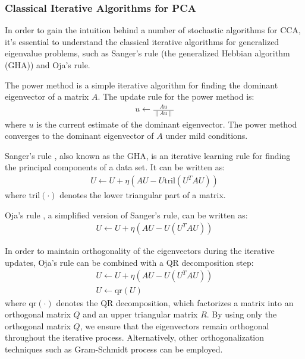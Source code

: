 \subsubsection{Classical Iterative Algorithms for PCA}
In order to gain the intuition behind a number of stochastic algorithms for CCA, it's essential to understand the classical iterative algorithms for generalized eigenvalue problems, such as Sanger's rule \cite{sanger1989optimal} (the generalized Hebbian algorithm (GHA)) and Oja's rule.

The power method is a simple iterative algorithm for finding the dominant eigenvector of a matrix $A$. The update rule for the power method is:
\begin{align}
u \leftarrow \frac{A u}{\|A u\|}
\end{align}
where $u$ is the current estimate of the dominant eigenvector. The power method converges to the dominant eigenvector of $A$ under mild conditions.

Sanger's rule \citep{sanger1989optimal}, also known as the GHA, is an iterative learning rule for finding the principal components of a data set. It can be written as:
\begin{align}
U \leftarrow U + \eta \left( A U - U \text{tril}(U^T A U) \right)
\end{align}
where \( \text{tril}(\cdot) \) denotes the lower triangular part of a matrix.

Oja's rule \citep{oja1982simplified}, a simplified version of Sanger's rule, can be written as:
\begin{align}
U \leftarrow U + \eta \left( A U - U (U^T A U) \right)
\end{align}

In order to maintain orthogonality of the eigenvectors during the iterative updates, Oja's rule can be combined with a QR decomposition step:
\begin{align}
U \leftarrow U + \eta \left( A U - U (U^T A U) \right) \\
U \leftarrow \text{qr}(U)
\end{align}
where \( \text{qr}(\cdot) \) denotes the QR decomposition, which factorizes a matrix into an orthogonal matrix $Q$ and an upper triangular matrix $R$. By using only the orthogonal matrix $Q$, we ensure that the eigenvectors remain orthogonal throughout the iterative process. Alternatively, other orthogonalization techniques such as Gram-Schmidt process \citep{schmidt1907theorie,wong1935application} can be employed.

